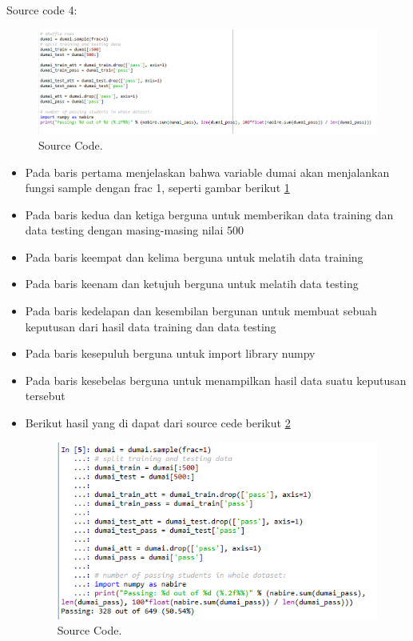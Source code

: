 Source code 4:
		\begin{figure}[ht]
		\centerline{\includegraphics[width=1\textwidth]{figures/im/imQ4.png}}
		\caption{Source Code.}
		\label{empatQ}
		\end{figure}
\begin{itemize}
\item Pada baris pertama menjelaskan bahwa variable dumai akan menjalankan fungsi sample dengan frac 1, seperti gambar berikut \ref{empatQ}
\item Pada baris kedua dan ketiga berguna untuk memberikan data training dan data testing dengan masing-masing nilai 500
\item Pada baris keempat dan kelima berguna untuk melatih data training
\item Pada baris keenam dan ketujuh berguna untuk melatih data testing
\item Pada baris kedelapan dan kesembilan bergunan untuk membuat sebuah keputusan dari hasil data training dan data testing
\item Pada baris kesepuluh berguna untuk import library numpy
\item Pada baris kesebelas berguna untuk menampilkan hasil data suatu keputusan tersebut
\item Berikut hasil yang di dapat dari source cede berikut \ref{empatC}
		\begin{figure}[ht]
		\centerline{\includegraphics[width=1\textwidth]{figures/im/imCode4.png}}
		\caption{Source Code.}
		\label{empatC}
		\end{figure}
\end{itemize}

